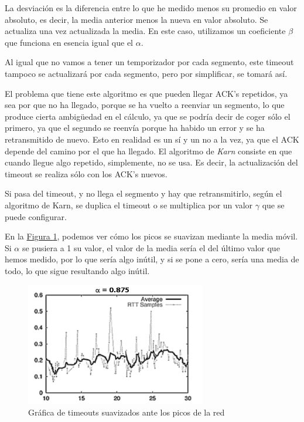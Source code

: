 \documentclass[10pt,a4paper,spanish]{report}
\begin{document}
La desviación es la diferencia entre lo que he medido menos su promedio en valor absoluto, es decir, la media anterior menos la nueva en valor absoluto. Se actualiza una vez actualizada la media. En este caso, utilizamos un coeficiente $\beta$ que funciona en esencia igual que el $\alpha$. 

Al igual que no vamos a tener un temporizador por cada segmento, este timeout tampoco se actualizará por cada segmento, pero por simplificar, se tomará así. 

El problema que tiene este algoritmo es que pueden llegar ACK's repetidos, ya sea por que no ha llegado, porque se ha vuelto a reenviar un segmento, lo que produce cierta ambigüedad en el cálculo, ya que se podría decir de coger sólo el primero, ya que el segundo se reenvía porque ha habido un error y se ha retransmitido de nuevo. Esto en realidad es un sí y un no a la vez, ya que el ACK depende del camino por el que ha llegado. El algoritmo de \textit{\textcolor{tema3}{Karn}} consiste en que cuando llegue algo repetido, simplemente, no se usa. Es decir, la actualización del timeout se realiza sólo con los ACK's nuevos. 

Si pasa del timeout, y no llega el segmento y hay que retransmitirlo, según el algoritmo de Karn, se duplica el timeout o se multiplica por un valor $\gamma$ que se puede configurar.

En la \hyperref[timeouts_med]{Figura \ref*{timeouts_med}}, podemos ver cómo los picos se suavizan mediante la media móvil. Si $\alpha$ se pusiera a 1 su valor, el valor de la media sería el del último valor que hemos medido, por lo que sería algo inútil, y si se pone a cero, sería una media de todo, lo que sigue resultando algo inútil.

\begin{figure}[!h]
  \centering
  \includegraphics[width=0.7\textwidth]{timeouts_med}
  \caption{Gráfica de timeouts suavizados ante los picos de la red}
  \label{timeouts_med}
\end{figure}
\end{document}
